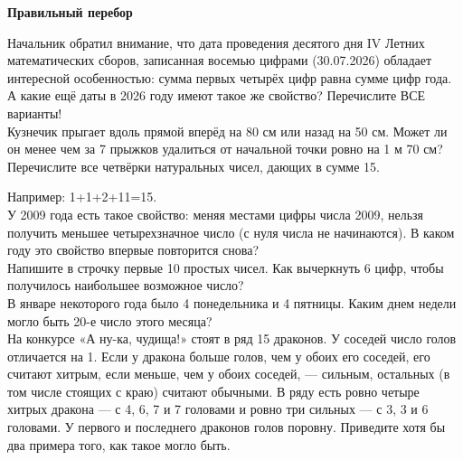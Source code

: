 \centerline{\bf \Huge Правильный перебор}

 Начальник обратил внимание, что дата проведения десятого дня IV Летних математических сборов, записанная восемью цифрами (30.07.2026) обладает интересной особенностью: сумма первых четырёх цифр равна сумме цифр года. А какие ещё даты в 2026 году имеют такое же свойство? Перечислите ВСЕ варианты!\\

 Кузнечик прыгает вдоль прямой вперёд на 80 см или назад на 50 см. Может ли он менее чем за 7 прыжков удалиться от начальной точки ровно на 1 м 70 см?\\

 Перечислите все четвёрки натуральных чисел, дающих в сумме
15. 

Например: 1+1+2+11=15.\\


 У 2009 года есть такое свойство: меняя местами цифры числа 2009, нельзя получить меньшее четырехзначное число (с нуля числа не начинаются). В каком году это свойство впервые повторится снова?\\

  Напишите в строчку первые 10 простых чисел. Как вычеркнуть 6 цифр, чтобы получилось наибольшее возможное число?\\

 В январе некоторого года было 4 понедельника и 4 пятницы.
Каким днем недели могло быть 20-е число этого месяца?\\


  На конкурсе «А ну-ка, чудища!» стоят в ряд 15 драконов. У соседей число голов отличается на 1. Если у дракона больше голов, чем у обоих его
соседей, его считают хитрым, если меньше, чем у обоих соседей, — сильным, остальных (в том
числе стоящих с краю) считают обычными. В ряду есть ровно четыре хитрых дракона — с 4,
6, 7 и 7 головами и ровно три сильных — с 3, 3 и 6 головами. У первого и последнего драконов
голов поровну. Приведите хотя бы два примера того, как такое могло быть.

